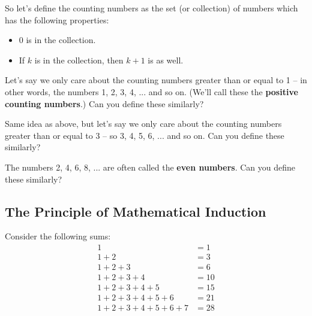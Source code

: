 So let's define the counting numbers as the set (or collection) of numbers which has the following properties:

\begin{itemize}
\item 0 is in the collection.
\item If $k$ is in the collection, then $k+1$ is as well. 
\end{itemize}

\begin{exercise}
Let's say we only care about the counting numbers greater than or equal to 1 -- in other words, the numbers 1, 2, 3, 4, ... and so on. (We'll call these the \textbf{positive counting numbers}.) Can you define these similarly?
\end{exercise}

\begin{exercise}
Same idea as above, but let's say we only care about the counting numbers greater than or equal to 3 -- so 3, 4, 5, 6, ... and so on. Can you define these similarly?
\end{exercise}

\begin{exercise}
\label{ex:even-numbers}
The numbers 2, 4, 6, 8, ... are often called the \textbf{even numbers}. Can you define these similarly?
\end{exercise}


\subsection{The Principle of Mathematical Induction}

Consider the following sums:
\begin{align*}
1 &= 1 \\
1 + 2 &= 3 \\
1 + 2 + 3 &= 6 \\
1 + 2 + 3 + 4 &= 10 \\
1 + 2 + 3 + 4 + 5 &= 15 \\
1 + 2 + 3 + 4 + 5 + 6 &= 21 \\
1 + 2 + 3 + 4 + 5 + 6 + 7 &= 28 \\
\end{align*}

